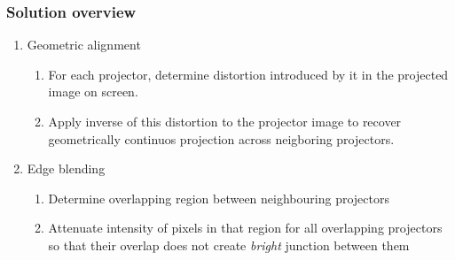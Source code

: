 \documentclass{beamer}
\begin{document}
\begin{frame}
\frametitle{Solution overview}
\begin{enumerate}
\item Geometric alignment
\begin{enumerate}
\item For each projector, determine distortion introduced by it  in the projected image on screen.
\item Apply inverse of this distortion to the projector image to recover geometrically continuos projection across neigboring projectors.
\end{enumerate}
\item Edge blending
\begin{enumerate}
\item Determine overlapping region between neighbouring projectors
\item Attenuate intensity of pixels in that region for all overlapping projectors so that their overlap does not create \textit{bright} junction between them
\end{enumerate}
\end{enumerate}
\end{frame}

\end{document}
